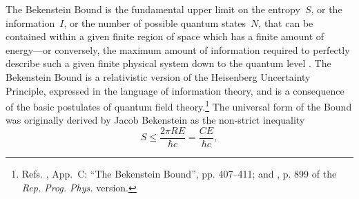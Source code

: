 \documentclass[letterpaper,12pt]{article}
\begin{document}
The Bekenstein Bound is the fundamental upper limit on the \gls{entropy}~\( S \), or the information~\( I \), or the number of possible quantum states~\( N \), that can be contained within a given finite region of space which has a finite amount of energy---or conversely, the maximum amount of information required to perfectly describe such a given finite physical system down to the quantum level \cite{Bekenstein1972,Bekenstein1973,Bekenstein1974,Bekenstein1975,Bekenstein1980,Bekenstein1981-1,Bekenstein1981-1b,Bekenstein1981-3,Bekenstein1982,Bekenstein1984,Bekenstein1988,Bekenstein1989,BekensteinSchiffer1990,Bekenstein1993,Bekenstein1999,Bekenstein2000-9,Schiffer1989,Zaslavskii1996-1,Zaslavskii1996-9}. The Bekenstein Bound is a relativistic version of the Heisenberg Uncertainty Principle, expressed in the language of information theory, and is a consequence of the basic postulates of quantum field theory.\footnote{Refs. , App.~C: ``The Bekenstein Bound'', pp. 407--411; and , p. 899 of the \emph{Rep. Prog. Phys.} version.} The universal form of the Bound was originally derived by Jacob Bekenstein \cite{Bekenstein1981-1,Bekenstein2004,Bekenstein2008a} as the non-strict inequality\begin{equation}
S \leq \frac{2 \pi R E}{\hbar c} = \frac{C E}{\hbar c},
\label{eq:BekensteinBoundS}

\end{equation}
\end{document}
